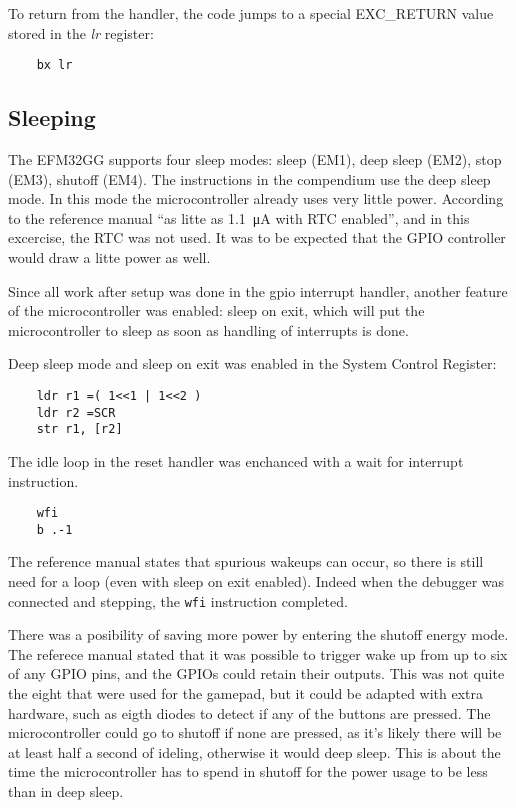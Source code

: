 To return from the handler, the code jumps to a special EXC\_RETURN value stored in the \emph{lr} register:

\begin{verbatim}
    bx lr
\end{verbatim}


\subsection{Sleeping}
The EFM32GG supports four sleep modes: sleep (EM1), deep sleep (EM2), stop (EM3), shutoff (EM4).
The instructions in the compendium use the deep sleep mode.
In this mode the microcontroller already uses very little power.
According to the reference manual ``as litte as \SI{1.1}{\micro\ampere} with RTC enabled'', and in this excercise, the RTC was not used.
It was to be expected that the GPIO controller would draw a litte power as well.

Since all work after setup was done in the gpio interrupt handler, another feature of the microcontroller was enabled: sleep on exit, which will put the microcontroller to sleep as soon as handling of interrupts is done.

Deep sleep mode and sleep on exit was enabled in the System Control Register:
\begin{verbatim}
    ldr r1 =( 1<<1 | 1<<2 )
    ldr r2 =SCR
    str r1, [r2]
\end{verbatim}

The idle loop in the reset handler was enchanced with a wait for interrupt instruction.
\begin{verbatim}
    wfi
    b .-1
\end{verbatim}

The reference manual states that spurious wakeups can occur, so there is still need for a loop (even with sleep on exit enabled).
Indeed when the debugger was connected and stepping, the \texttt{wfi} instruction completed.

There was a posibility of saving more power by entering the shutoff energy mode.
The referece manual stated that it was possible to trigger wake up from up to six of any GPIO pins, and the GPIOs could retain their outputs.
This was not quite the eight that were used for the gamepad, but it could be adapted with extra hardware, such as eigth diodes to detect if any of the buttons are pressed.
The microcontroller could go to shutoff if none are pressed, as it's likely there will be at least half a second of ideling, otherwise it would deep sleep.
This is about the time the microcontroller has to spend in shutoff for the power usage to be less than in deep sleep.
